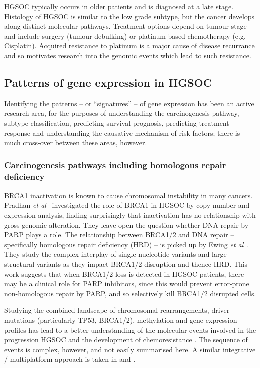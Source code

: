 \documentclass[tikz, 12pt,a4paper,oneside,fleqn]{article}
\newcommand{\etal}{{\em et al\/}}
\begin{document}
HGSOC typically occurs in older patients and is diagnosed at a late stage.   Histology of HGSOC is similar to the low grade subtype, but the cancer develops along distinct molecular pathways. 
Treatment options depend on tumour stage and include surgery (tumour debulking) or platinum-based chemotherapy (e.g. Cisplatin).  Acquired resistance to platinum is a major cause of disease recurrance\cite{Patch2015} and so motivates research into the genomic events which lead to such resistance.


\subsection{Patterns of gene expression in HGSOC}

Identifying the patterns -- or ``signatures'' -- of gene expression has been an active research area, for the purposes of understanding the carcinogenesis pathway, subtype classification, predicting survival prognosis, predicting treatment response and understanding the causative mechanism of risk factors; there is much cross-over between these areas, however.

\subsubsection{Carcinogenesis pathways including homologous repair deficiency}

BRCA1 inactivation is known to cause chromosomal instability in many cancers.  Pradhan \etal\ \cite{Pradhan2010} investigated the role of BRCA1 in HGSOC by copy number and expression analysis, finding surprisingly that inactivation has no relationship with gross genomic alteration.  They leave open the question whether DNA repair by PARP plays a role.   The relationship between BRCA1/2 and DNA repair -- specifically homologous repair deficiency (HRD) -- is picked up by Ewing \etal\ \cite{Ewing2020}.  They study the complex interplay of single nucleotide variants and large structural variants as they impact BRCA1/2 disruption and thence HRD.  This work suggests that when BRCA1/2 loss is detected in HGSOC patients, there may be a clinical role for PARP inhibitors, since this would prevent error-prone non-homologous repair by PARP, and so selectively kill BRCA1/2 disrupted cells.

Studying the combined landscape of chromosomal rearrangements, driver mutations (particularly TP53, BRCA1/2), methylation and gene expression profiles has lead to a better understanding of the molecular events involved in the progression HGSOC and the development of chemoresistance \cite{Patch2015}.  The sequence of events is complex, however, and not easily summarised here.   A similar integrative / multiplatform approach is taken in \cite{He2017a} and \cite{Hoadley2014}.
\end{document}
